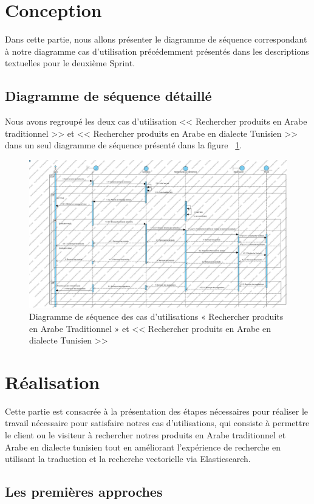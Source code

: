 \section{Conception}
\noindent
Dans cette partie, nous allons présenter le diagramme de séquence correspondant à notre diagramme cas d'utilisation précédemment présentés dans les descriptions textuelles pour le deuxième Sprint.

\subsection{Diagramme de séquence détaillé}
\noindent
Nous avons regroupé les deux cas d'utilisation << Rechercher produits en Arabe traditionnel >> et << Rechercher produits en Arabe en dialecte Tunisien >> dans un seul diagramme de séquence présenté dans la figure ~\ref{fig:diagseqsprint2}.

\begin{figure}[H]
	\centering
	\includegraphics[width=1\textwidth]{logos/seqsprint2.png}
	\caption{Diagramme de séquence des cas d’utilisations « Rechercher produits en Arabe Traditionnel » et << Rechercher produits en Arabe en dialecte Tunisien >>}
	\label{fig:diagseqsprint2}
\end{figure}

\section{Réalisation}
\noindent
Cette partie est consacrée à la présentation des étapes nécessaires pour réaliser le travail nécessaire pour satisfaire notres cas d'utilisations, qui consiste à permettre le client ou le visiteur à rechercher notres produits en Arabe traditionnel et Arabe en dialecte tunisien tout en améliorant l'expérience de recherche en utilisant la traduction et la recherche vectorielle via Elasticsearch.

\subsection{Les premières approches}
\noindent